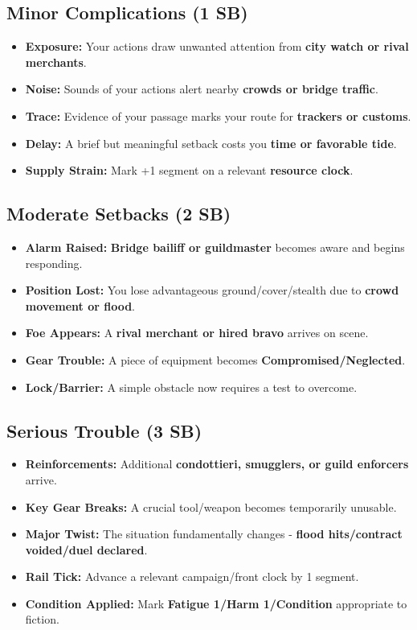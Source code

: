 \subsection*{Minor Complications (1 SB)}
\begin{itemize}
\item \textbf{Exposure:} Your actions draw unwanted attention from \textbf{city watch or rival merchants}.
\item \textbf{Noise:} Sounds of your actions alert nearby \textbf{crowds or bridge traffic}.
\item \textbf{Trace:} Evidence of your passage marks your route for \textbf{trackers or customs}.
\item \textbf{Delay:} A brief but meaningful setback costs you \textbf{time or favorable tide}.
\item \textbf{Supply Strain:} Mark +1 segment on a relevant \textbf{resource clock}.
\end{itemize}

\subsection*{Moderate Setbacks (2 SB)}
\begin{itemize}
\item \textbf{Alarm Raised:} \textbf{Bridge bailiff or guildmaster} becomes aware and begins responding.
\item \textbf{Position Lost:} You lose advantageous ground/cover/stealth due to \textbf{crowd movement or flood}.
\item \textbf{Foe Appears:} A \textbf{rival merchant or hired bravo} arrives on scene.
\item \textbf{Gear Trouble:} A piece of equipment becomes \textbf{Compromised/Neglected}.
\item \textbf{Lock/Barrier:} A simple obstacle now requires a test to overcome.
\end{itemize}

\subsection*{Serious Trouble (3 SB)}
\begin{itemize}
\item \textbf{Reinforcements:} Additional \textbf{condottieri, smugglers, or guild enforcers} arrive.
\item \textbf{Key Gear Breaks:} A crucial tool/weapon becomes temporarily unusable.
\item \textbf{Major Twist:} The situation fundamentally changes - \textbf{flood hits/contract voided/duel declared}.
\item \textbf{Rail Tick:} Advance a relevant campaign/front clock by 1 segment.
\item \textbf{Condition Applied:} Mark \textbf{Fatigue 1/Harm 1/Condition} appropriate to fiction.
\end{itemize}

